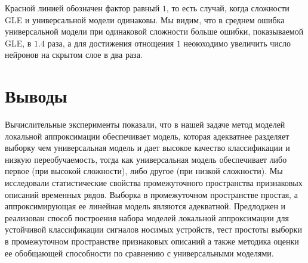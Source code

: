 \documentclass[12pt, fleqn, unicode]{article}
\begin{document}
Красной линией обозначен фактор равный $1$, то есть случай, когда сложности
GLE и универсальной модели одинаковы. Мы видим, что в среднем
ошибка универсальной модели при одинаковой сложности больше ошибки, показываемой
GLE, в $1.4$ раза, а для достижения отнощения $1$ неоюходимо увеличить
число нейронов на скрытом слое в два раза.


\newpage
\section{Выводы}

Вычислительные эксперименты показали, что в нашей задаче
метод моделей локальной аппроксимации обеспечивает модель, которая адекватнее
разделяет выборку чем универсальная модель
и дает высокое качество классификации и низкую переобучаемость, тогда как
универсальная модель обеспечивает либо первое (при высокой сложности), либо
другое (при низкой сложности). Мы исследовали статистические свойства
промежуточного пространства признаковых описаний временных рядов.
Выборка в промежуточном пространстве простая, а аппроксимирующая ее линейная
модель являются адекватной. Предлоджен и реализован способ построения набора
моделей локальной аппроксимации для устойчивой классификации сигналов носимых
устройств, тест простоты выборки в промежуточном пространстве признаковых
описаний а также методика оценки ее обобщающей способности по сравнению с
универсальными моделями.








\end{document}
